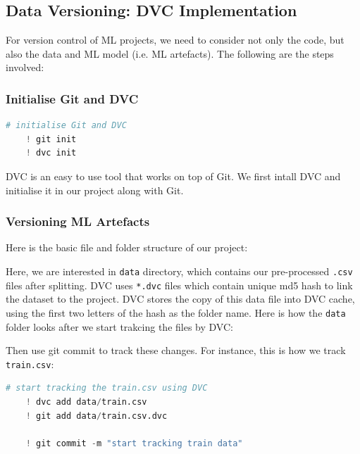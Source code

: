 \documentclass[12pt]{article}
\begin{document}
\newpage

\subsection{Data Versioning: DVC Implementation}

For version control of ML projects, we need to consider not only the code, but also the data and ML model (i.e. ML artefacts). The following are the steps involved:

\subsubsection{Initialise Git and DVC}
\begin{lstlisting}[language=Python]
    # initialise Git and DVC
    ! git init
    ! dvc init
\end{lstlisting}

DVC is an easy to use tool that works on top of Git. We first intall DVC and initialise it in our project along with Git.

\subsubsection{Versioning ML Artefacts}
Here is the basic file and folder structure of our project:

\medskip


\medskip

Here, we are interested in \verb|data| directory, which contains our pre-processed \verb|.csv| files after splitting. DVC uses \verb|*.dvc| files which contain unique md5 hash to link the dataset to the project. DVC stores the copy of this data file into DVC cache, using the first two letters of the hash as the folder name. Here is how the \verb|data| folder looks after we start trakcing the files by DVC:

\medskip


\medskip
Then use git commit to track these changes. For instance, this is how we track \verb|train.csv|:
\medskip

\begin{lstlisting}[language=Python]
    # start tracking the train.csv using DVC
    ! dvc add data/train.csv
    ! git add data/train.csv.dvc

    ! git commit -m "start tracking train data"
\end{lstlisting}
\end{document}
